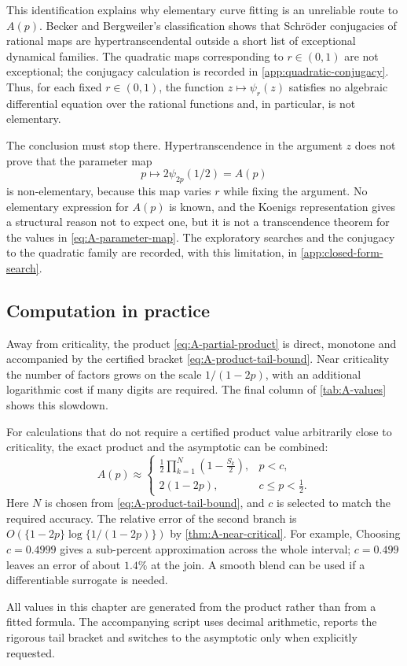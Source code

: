 This identification explains why elementary curve fitting is an unreliable route to
\(A(p)\).  Becker and Bergweiler's classification
\cite{BeckerBergweiler1995} shows that Schröder conjugacies of rational maps are
hypertranscendental outside a short list of exceptional dynamical families.  The
quadratic maps corresponding to \(r\in(0,1)\) are not exceptional; the conjugacy
calculation is recorded in \cref{app:quadratic-conjugacy}.  Thus, for each fixed
\(r\in(0,1)\), the function \(z\mapsto\psi_r(z)\) satisfies no algebraic
differential equation over the rational functions and, in particular, is not
elementary.

The conclusion must stop there.  Hypertranscendence in the argument \(z\) does not
prove that the parameter map
\begin{equation}
  p\longmapsto2\psi_{2p}(1/2)=A(p)
  \label{eq:A-parameter-map}
\end{equation}
is non-elementary, because this map varies \(r\) while fixing the argument.  No
elementary expression for \(A(p)\) is known, and the Koenigs representation gives a
structural reason not to expect one, but it is not a transcendence theorem for the
values in \cref{eq:A-parameter-map}.  The exploratory searches and the conjugacy to
the quadratic family are recorded, with this limitation, in
\cref{app:closed-form-search}.

\subsection{Computation in practice}
\label{sec:A-computation}

Away from criticality, the product \cref{eq:A-partial-product} is direct, monotone
and accompanied by the certified bracket \cref{eq:A-product-tail-bound}.  Near
criticality the number of factors grows on the scale \(1/(1-2p)\), with an additional
logarithmic cost if many digits are required.  The final column of
\cref{tab:A-values} shows this slowdown.

For calculations that do not require a certified product value arbitrarily close to
criticality, the exact product and the asymptotic can be combined:
\begin{equation}
  A(p)\approx
  \begin{cases}
    \displaystyle
    \frac12\prod_{k=1}^{N}\left(1-\frac{S_k}{2}\right),
      &p<c,\\[4mm]
    2(1-2p),&c\leq p<\tfrac12.
  \end{cases}
  \label{eq:A-practical}
\end{equation}
Here \(N\) is chosen from \cref{eq:A-product-tail-bound}, and \(c\) is selected to
match the required accuracy.  The relative error of the second branch is
\(O(\{1-2p\}\log\{1/(1-2p)\})\) by \cref{thm:A-near-critical}.  For example,
Choosing \(c=0.4999\) gives a sub-percent approximation across the whole interval;
\(c=0.499\) leaves an error of about \(1.4\%\) at the join.  A smooth blend can be
used if a differentiable surrogate is needed.

All values in this chapter are generated from the product rather than from a fitted
formula.  The accompanying script uses decimal arithmetic, reports the rigorous tail
bracket and switches to the asymptotic only when explicitly requested.

\FloatBarrier

